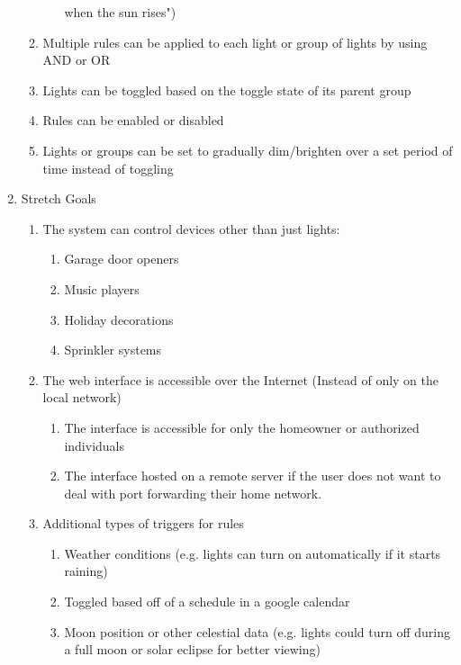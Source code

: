 \documentclass[oneside,openright]{book}
\begin{document}
\begin{enumerate}
\begin{enumerate}
\begin{enumerate}
                when the sun rises")
        \end{enumerate}
        \item Multiple rules can be applied to each light or group of lights by
            using AND or OR
        \item Lights can be toggled based on the toggle state of its parent
            group
        \item Rules can be enabled or disabled
        \item Lights or groups can be set to gradually dim/brighten over a set
            period of time instead of toggling
    \end{enumerate}
    \item Stretch Goals
    \begin{enumerate}
        \item The system can control devices other than just lights:
        \begin{enumerate}
            \item Garage door openers
            \item Music players
            \item Holiday decorations
            \item Sprinkler systems
        \end{enumerate}
        \item The web interface is accessible over the Internet (Instead of
            only on the local network)
        \begin{enumerate}
            \item The interface is accessible for only the homeowner or
                authorized individuals
            \item The interface hosted on a remote server if the user does not
                want to deal with port forwarding their home network.
        \end{enumerate}
        \item Additional types of triggers for rules
        \begin{enumerate}
            \item Weather conditions (e.g. lights can turn on automatically if
                it starts raining)
            \item Toggled based off of a schedule in a google calendar
            \item Moon position or other celestial data (e.g. lights could turn
                off during a full moon or solar eclipse for better viewing)

\end{enumerate}
\end{enumerate}
\end{enumerate}
\end{document}
